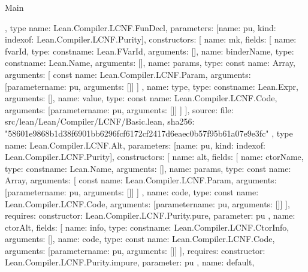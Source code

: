 \begin{lexlean}{Main}
\begin{toolingmodule}
{{{      }
    },
    type{
      name: Lean.Compiler.LCNF.FunDecl,
      parameters: [{name: pu, kind: index{of: Lean.Compiler.LCNF.Purity}}],
      constructors: [
        {
          name: mk,
          fields: [
            {name: fvarId, type: const{name: Lean.FVarId, arguments: []}},
            {name: binderName, type: const{name: Lean.Name, arguments: []}},
            {
              name: params,
              type: const{
                name: Array,
                arguments: [
                  const{
                    name: Lean.Compiler.LCNF.Param,
                    arguments: [parameter{name: pu, arguments: []}]
                  }
                ]
              }
            },
            {name: type, type: const{name: Lean.Expr, arguments: []}},
            {
              name: value,
              type: const{
                name: Lean.Compiler.LCNF.Code,
                arguments: [parameter{name: pu, arguments: []}]
              }
            }
          ]
        }
      ],
      source: {
        file: src/lean/Lean/Compiler/LCNF/Basic.lean,
        sha256: "58601e9868b1d38f6901bb6296fcf6172cf2417d6eaec0b57f95b61a07e9e3fc"
      }
    },
    type{
      name: Lean.Compiler.LCNF.Alt,
      parameters: [{name: pu, kind: index{of: Lean.Compiler.LCNF.Purity}}],
      constructors: [
        {
          name: alt,
          fields: [
            {name: ctorName, type: const{name: Lean.Name, arguments: []}},
            {
              name: params,
              type: const{
                name: Array,
                arguments: [
                  const{
                    name: Lean.Compiler.LCNF.Param,
                    arguments: [parameter{name: pu, arguments: []}]
                  }
                ]
              }
            },
            {
              name: code,
              type: const{
                name: Lean.Compiler.LCNF.Code,
                arguments: [parameter{name: pu, arguments: []}]
              }
            }
          ],
          requires: {constructor: Lean.Compiler.LCNF.Purity.pure, parameter: pu}
        },
        {
          name: ctorAlt,
          fields: [
            {name: info, type: const{name: Lean.Compiler.LCNF.CtorInfo, arguments: []}},
            {
              name: code,
              type: const{
                name: Lean.Compiler.LCNF.Code,
                arguments: [parameter{name: pu, arguments: []}]
              }
            }
          ],
          requires: {constructor: Lean.Compiler.LCNF.Purity.impure, parameter: pu}
        },
        {
          name: default,
}}}
\end{toolingmodule}
\end{lexlean}
